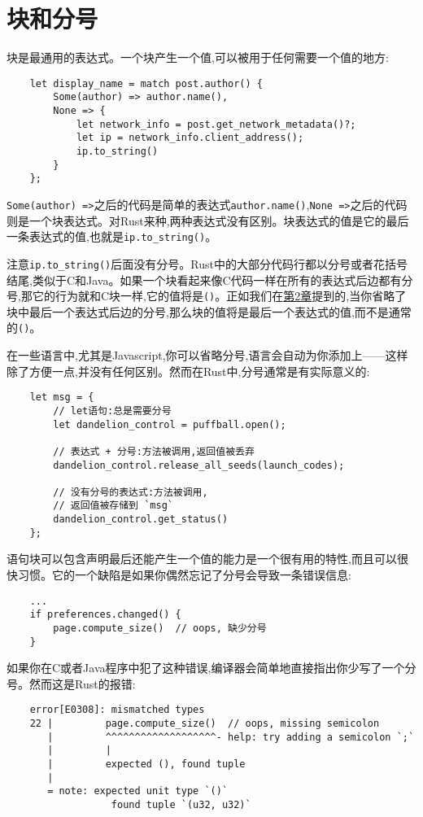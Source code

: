 \section{块和分号}

块是最通用的表达式。一个块产生一个值,可以被用于任何需要一个值的地方:\begin{verbatim}
    let display_name = match post.author() {
        Some(author) => author.name(),
        None => {
            let network_info = post.get_network_metadata()?;
            let ip = network_info.client_address();
            ip.to_string()
        }
    };
\end{verbatim}
\texttt{Some(author) =>}之后的代码是简单的表达式\texttt{author.name()},\texttt{None =>}之后的代码则是一个块表达式。对Rust来种,两种表达式没有区别。块表达式的值是它的最后一条表达式的值,也就是\texttt{ip.to\_string()}。

注意\texttt{ip.to\_string()}后面没有分号。Rust中的大部分代码行都以分号或者花括号结尾,类似于C和Java。如果一个块看起来像C代码一样在所有的表达式后边都有分号,那它的行为就和C块一样,它的值将是\texttt{()}。正如我们在\hyperref[ch02]{第2章}提到的,当你省略了块中最后一个表达式后边的分号,那么块的值将是最后一个表达式的值,而不是通常的\texttt{()}。

在一些语言中,尤其是Javascript,你可以省略分号,语言会自动为你添加上——这样除了方便一点,并没有任何区别。然而在Rust中,分号通常是有实际意义的:
\begin{verbatim}
    let msg = {
        // let语句:总是需要分号
        let dandelion_control = puffball.open();

        // 表达式 + 分号:方法被调用,返回值被丢弃
        dandelion_control.release_all_seeds(launch_codes);

        // 没有分号的表达式:方法被调用,
        // 返回值被存储到 `msg`
        dandelion_control.get_status()
    };
\end{verbatim}

语句块可以包含声明最后还能产生一个值的能力是一个很有用的特性,而且可以很快习惯。它的一个缺陷是如果你偶然忘记了分号会导致一条错误信息:
\begin{verbatim}
    ...
    if preferences.changed() {
        page.compute_size()  // oops, 缺少分号
    }
\end{verbatim}

如果你在C或者Java程序中犯了这种错误,编译器会简单地直接指出你少写了一个分号。然而这是Rust的报错:
\begin{verbatim}
    error[E0308]: mismatched types
    22 |         page.compute_size()  // oops, missing semicolon
       |         ^^^^^^^^^^^^^^^^^^^- help: try adding a semicolon `;`
       |         |
       |         expected (), found tuple
       |
       = note: expected unit type `()`
                  found tuple `(u32, u32)`
\end{verbatim}

